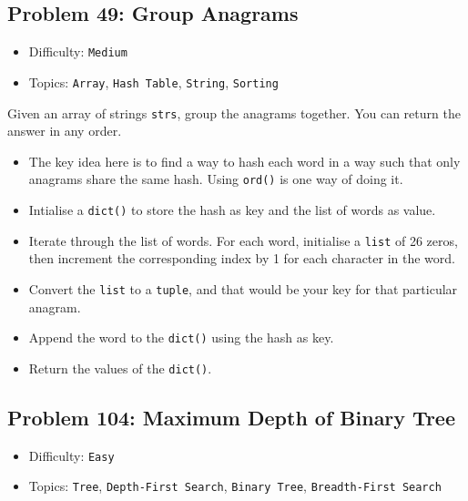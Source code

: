\subsection*{Problem 49: Group Anagrams}
\begin{itemize}
    \setlength\itemsep{0.1em}  %
    \setlength\parskip{0pt}    %
    \item Difficulty: \texttt{Medium}
    \item Topics: \texttt{Array}, \texttt{Hash Table}, \texttt{String}, \texttt{Sorting}
\end{itemize}
\begin{tcolorbox}[colback=gray!5!white, colframe=gray!80!black, boxrule=0.5pt, arc=2pt, left=6pt, right=6pt, top=6pt, bottom=6pt]
    Given an array of strings \texttt{strs}, group the anagrams together. You can return the answer in
    any order.
\end{tcolorbox}
\begin{itemize}
    \item The key idea here is to find a way to hash each word in a way such that 
    only anagrams share the same hash. Using \texttt{ord()} is one way of doing it.
    \item Intialise a \texttt{dict()} to store the hash as key and the list of words as value.
    \item Iterate through the list of words. For each word, initialise a \texttt{list} of 26 zeros,
    then increment the corresponding index by 1 for each character in the word.
    \item Convert the \texttt{list} to a \texttt{tuple}, and that would be your key 
    for that particular anagram.
    \item Append the word to the \texttt{dict()} using the hash as key.
    \item Return the values of the \texttt{dict()}.
\end{itemize}

\subsection*{Problem 104: Maximum Depth of Binary Tree}
\begin{itemize}
    \setlength\itemsep{0.1em}  %
    \setlength\parskip{0pt}    %
    \item Difficulty: \texttt{Easy}
    \item Topics: \texttt{Tree}, \texttt{Depth-First Search}, \texttt{Binary Tree}, \texttt{Breadth-First Search}
\end{itemize}

